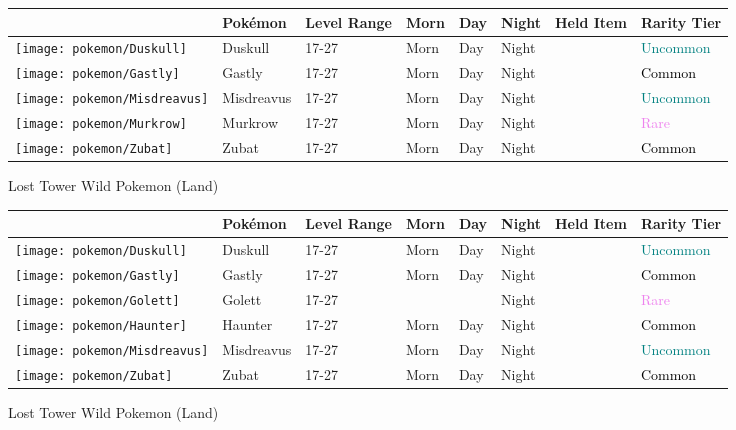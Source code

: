 \begin{longtable}{||l l l l l l l l||}%
\hline%
&Pokémon&Level Range&Morn&Day&Night&Held Item&Rarity Tier\\%
\hline%
\endhead%
\hline%
\texttt{[image: pokemon/Duskull]}&Duskull&17{-}27&Morn&Day&Night&&\textcolor{teal}{%
Uncommon%
}\\%
\hline%
\texttt{[image: pokemon/Gastly]}&Gastly&17{-}27&Morn&Day&Night&&\textcolor{black}{%
Common%
}\\%
\hline%
\texttt{[image: pokemon/Misdreavus]}&Misdreavus&17{-}27&Morn&Day&Night&&\textcolor{teal}{%
Uncommon%
}\\%
\hline%
\texttt{[image: pokemon/Murkrow]}&Murkrow&17{-}27&Morn&Day&Night&&\textcolor{violet}{%
Rare%
}\\%
\hline%
\texttt{[image: pokemon/Zubat]}&Zubat&17{-}27&Morn&Day&Night&&\textcolor{black}{%
Common%
}\\%
\hline%
\end{longtable}%
\caption{Lost Tower Wild Pokemon (Land)}%
\begin{longtable}{||l l l l l l l l||}%
\hline%
&Pokémon&Level Range&Morn&Day&Night&Held Item&Rarity Tier\\%
\hline%
\endhead%
\hline%
\texttt{[image: pokemon/Duskull]}&Duskull&17{-}27&Morn&Day&Night&&\textcolor{teal}{%
Uncommon%
}\\%
\hline%
\texttt{[image: pokemon/Gastly]}&Gastly&17{-}27&Morn&Day&Night&&\textcolor{black}{%
Common%
}\\%
\hline%
\texttt{[image: pokemon/Golett]}&Golett&17{-}27&&&Night&&\textcolor{violet}{%
Rare%
}\\%
\hline%
\texttt{[image: pokemon/Haunter]}&Haunter&17{-}27&Morn&Day&Night&&\textcolor{black}{%
Common%
}\\%
\hline%
\texttt{[image: pokemon/Misdreavus]}&Misdreavus&17{-}27&Morn&Day&Night&&\textcolor{teal}{%
Uncommon%
}\\%
\hline%
\texttt{[image: pokemon/Zubat]}&Zubat&17{-}27&Morn&Day&Night&&\textcolor{black}{%
Common%
}\\%
\hline%
\end{longtable}%
\caption{Lost Tower Wild Pokemon (Land)}